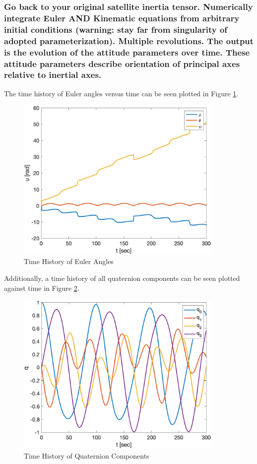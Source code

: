\subsubsection{Go back to your original satellite inertia tensor. Numerically integrate Euler AND Kinematic equations from arbitrary initial conditions (warning: stay far from singularity of adopted parameterization). Multiple revolutions. The output is the evolution of the attitude parameters over time. These attitude parameters describe orientation of principal axes relative to inertial axes.}

The time history of Euler angles versus time can be seen plotted in  Figure \ref{fig:time_history_EA}.

\begin{figure} [H]
    \centering
    \captionsetup{justification = centering}
    \includegraphics[width = 10cm] {Images/time_history_EA.png}
    \caption{Time History of Euler Angles}
    \label{fig:time_history_EA}
\end{figure}

Additionally, a time history of all quaternion components can be seen plotted against time in Figure \ref{fig:time_history_quaternion}. 

\begin{figure} [H]
    \centering
    \captionsetup{justification = centering}
    \includegraphics[width = 10cm] {Images/time_history_quat.png}
    \caption{Time History of Quaternion Components}
    \label{fig:time_history_quaternion}
\end{figure}

